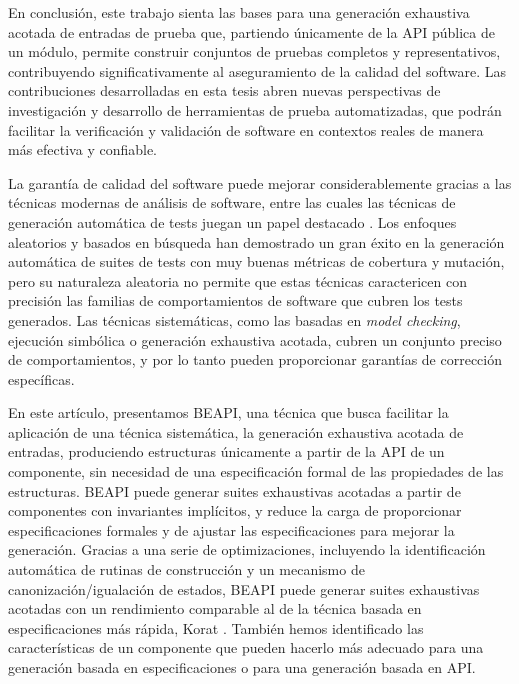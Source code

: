 En conclusión, este trabajo sienta las bases para una generación exhaustiva acotada de entradas de prueba que, partiendo únicamente de la API pública de un módulo, 
permite construir conjuntos de pruebas completos y representativos, contribuyendo significativamente al aseguramiento de la calidad del software. 
Las contribuciones desarrolladas en esta tesis abren nuevas perspectivas de investigación y desarrollo de herramientas de prueba automatizadas, 
que podrán facilitar la verificación y validación de software en contextos reales de manera más efectiva y confiable.


La garantía de calidad del software puede mejorar considerablemente gracias a las técnicas modernas de análisis de software, 
entre las cuales las técnicas de generación automática de tests juegan un papel destacado \cite{Cadar08, Luckow14, Fraser11, Pacheco07, Ma15, goGodefroid05, Marinov01, Boyapati02,Godefroid12}. 
Los enfoques aleatorios y basados en búsqueda han demostrado un gran éxito en la generación automática de suites de tests con muy buenas métricas de cobertura y mutación, 
pero su naturaleza aleatoria no permite que estas técnicas caractericen con precisión las familias de comportamientos de software 
que cubren los tests generados. Las técnicas sistemáticas, como las basadas en \emph{model checking}, ejecución simbólica 
o generación exhaustiva acotada, cubren un conjunto preciso de comportamientos, y por lo tanto pueden proporcionar garantías 
de corrección específicas.

En este artículo, presentamos BEAPI, una técnica que busca facilitar la aplicación de una técnica sistemática, 
la generación exhaustiva acotada de entradas, produciendo estructuras únicamente a partir de la API de un componente, 
sin necesidad de una especificación formal de las propiedades de las estructuras. BEAPI puede generar suites exhaustivas acotadas 
a partir de componentes con invariantes implícitos, y reduce la carga de proporcionar especificaciones formales y de ajustar 
las especificaciones para mejorar la generación. Gracias a una serie de optimizaciones, incluyendo la identificación automática de 
rutinas de construcción y un mecanismo de canonización/igualación de estados, BEAPI puede generar suites exhaustivas acotadas con 
un rendimiento comparable al de la técnica basada en especificaciones más rápida, Korat \cite{Boyapati02}. También hemos identificado las
características de un componente que pueden hacerlo más adecuado para una generación basada en especificaciones o para una generación basada en API.

